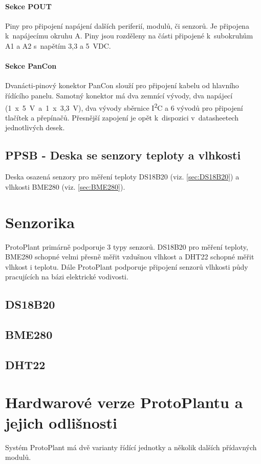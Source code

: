 \paragraph{Sekce POUT} 
Piny pro připojení napájení dalších periferií, modulů, či senzorů.
Je připojena k~napájecímu okruhu A.
Piny jsou rozděleny na části připojené k~subokruhům A1 a A2 s~napětím 3,3 a 5~VDC.

\paragraph{Sekce PanCon}
Dvanácti-pinový konektor PanCon slouží pro připojení kabelu od hlavního řídícího panelu. 
Samotný konektor má dva zemnící vývody, dva napájecí (1~x~5~V~a~1~x~3,3~V), dva vývody sběrnice I\textsuperscript{2}C a 6 vývodů pro připojení tlačítek a přepínačů.
Přesnější zapojení je opět k~dispozici v~datasheetech jednotlivých desek.

\subsection{PPSB - Deska se senzory teploty a vlhkosti}
Deska osazená senzory pro měření teploty DS18B20 (viz. \autoref{sec:DS18B20}) a vlhkosti BME280 (viz. \autoref{sec:BME280}). 

\section{Senzorika}
ProtoPlant primárně podporuje 3 typy senzorů. 
DS18B20 pro měření teploty, BME280 schopné velmi přesně měřit vzdušnou vlhkost a DHT22 schopné měřit vlhkost i teplotu.
Dále ProtoPlant podporuje připojení senzorů vlhkosti půdy pracujících na bázi elektrické vodivosti.

\subsection{DS18B20}
\label{sec:DS18B20}


\subsection{BME280}
\label{sec:BME280}


\subsection{DHT22}
\label{sec:DHT22}


\section{Hardwarové verze ProtoPlantu a jejich odlišnosti}
Systém ProtoPlant má dvě varianty řídící jednotky a několik dalších přídavných modulů.

